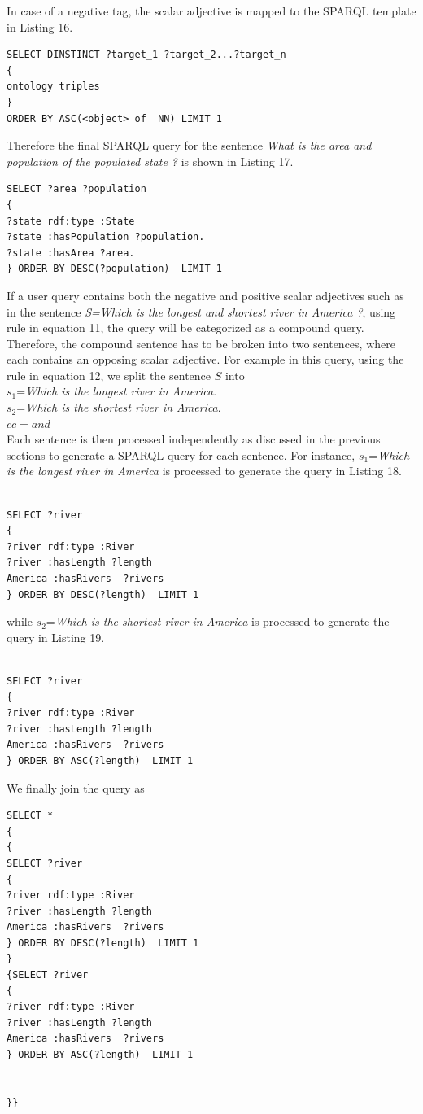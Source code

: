 \documentclass[review]{elsarticle}
\begin{document}
In case of a negative tag, the scalar adjective is mapped to the SPARQL template in Listing 16. 
\begin{lstlisting}[caption=SPARQL template for negative scalar adjective ]
SELECT DINSTINCT ?target_1 ?target_2...?target_n
{
ontology triples
}
ORDER BY ASC(<object> of  NN) LIMIT 1
\end{lstlisting}
Therefore the final SPARQL query for the sentence \textit{What is the area and population of the  populated state ?} is shown in Listing 17.
\begin{lstlisting}[caption=SPARQL query ]
SELECT ?area ?population
{
?state rdf:type :State
?state :hasPopulation ?population.
?state :hasArea ?area.
} ORDER BY DESC(?population)  LIMIT 1
\end{lstlisting}

If a user query  contains both the negative and positive scalar adjectives such as in the sentence \textit{S=Which is the longest and shortest river in America ?}, using rule  in equation 11,  the query will be categorized as a compound query. Therefore,  the compound sentence has to be broken into two sentences, where each contains an opposing scalar adjective. For example in this query, using the rule in equation 12, we split the sentence $S$ into\\
$s_1$=\textit{Which  is the longest river in America}.\\
$s_2$=\textit{Which is the shortest river in America}.\\
$cc=and$\\
Each sentence is then processed independently  as discussed in the previous sections  to generate a SPARQL query for each sentence.  For instance,  $s_1$=\textit{Which is the longest river in America} is processed to generate the query in Listing  18.

\begin{lstlisting}[caption=SPARQL query]

SELECT ?river
{
?river rdf:type :River
?river :hasLength ?length
America :hasRivers  ?rivers
} ORDER BY DESC(?length)  LIMIT 1
\end{lstlisting}
while  $s_2$=\textit{Which is the shortest river in America} is processed to generate the query in Listing 19.
\begin{lstlisting}[caption=SPARQL query]

SELECT ?river
{
?river rdf:type :River
?river :hasLength ?length
America :hasRivers  ?rivers
} ORDER BY ASC(?length)  LIMIT 1
\end{lstlisting}
We finally join the query as 
\begin{lstlisting}
SELECT *
{
{
SELECT ?river
{
?river rdf:type :River
?river :hasLength ?length
America :hasRivers  ?rivers
} ORDER BY DESC(?length)  LIMIT 1
}
{SELECT ?river
{
?river rdf:type :River
?river :hasLength ?length
America :hasRivers  ?rivers
} ORDER BY ASC(?length)  LIMIT 1


}}
\end{lstlisting}
\end{document}
